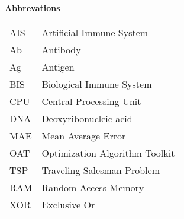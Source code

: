 %
%
% 
% 
% 

\begin{center}
{\Large\bfseries Abbrevations}
\end{center}

\begin{table*}[htbp]
		\begin{tabular}{ll}
			AIS & Artificial Immune System \\
			Ab & Antibody \\
			Ag & Antigen \\
			BIS & Biological Immune System \\
			CPU & Central Processing Unit\\
			DNA & Deoxyribonucleic acid\\
			MAE & Mean Average Error\\
			OAT & Optimization Algorithm Toolkit\\
			TSP & Traveling Salesman Problem\\
			RAM & Random Access Memory\\
			XOR & Exclusive Or
		\end{tabular}
\end{table*}